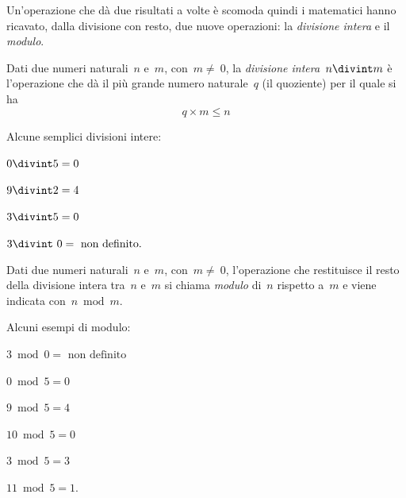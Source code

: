 Un'operazione che dà due risultati a volte è scomoda quindi i matematici 
hanno ricavato, dalla divisione con resto, due nuove operazioni: 
la \emph{divisione intera} e il \emph{modulo}.

\begin{definizione}
 Dati due numeri naturali~$n$ e~$m$, con~$m\neq~0$, la 
 \emph{divisione intera}~$n\divint m$ è l'operazione che dà il più grande 
 numero naturale~$q$ (il quoziente) per il quale si ha
$$q\times m\le n$$
\end{definizione}

\newpage

\begin{exrig}
 \begin{esempio}
 Alcune semplici divisioni intere:
 
\begin{multicols}{2}
$0 \divint 5=0$

$9 \divint 2=4$

$3\divint 5=0$

$3\divint~0=\text{ non definito.}$
\end{multicols}

 \end{esempio}
\end{exrig}

\begin{definizione}
 Dati due numeri naturali~$n$ e~$m$, con~$m\neq~0$, l'operazione che 
 restituisce il resto della divisione intera tra~$n$ e~$m$ si chiama 
 \emph{modulo} di~$n$ rispetto a~$m$ e viene indicata con~$n\bmod{m}$.
\end{definizione}

\begin{exrig}
 \begin{esempio}
 Alcuni esempi di modulo:
 
\begin{multicols}{3}
$3 \bmod 0= \text{ non definito}$

$0 \bmod 5= 0$

$9 \bmod 5 = 4$

$10 \bmod 5 = 0$

$3 \bmod 5 = 3$

$11 \bmod 5 = 1$.
\end{multicols}

 \end{esempio}
\end{exrig}


